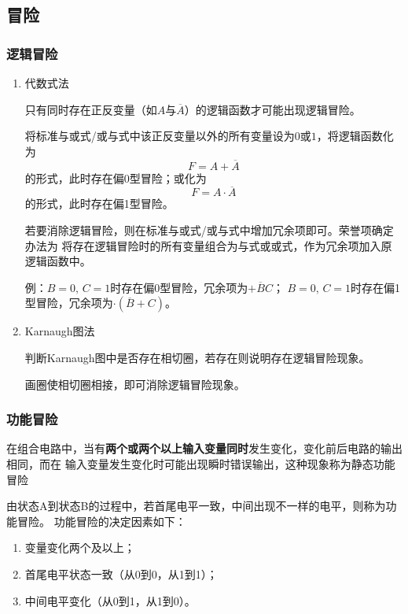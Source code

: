 \documentclass[UTF8,fontset=fandol,zihao=5]{ctexart}
\begin{document}
\subsection{冒险}

\subsubsection{逻辑冒险}

\begin{methodbox}[逻辑冒险的判断与消除方法]
  \begin{enumerate}[label=\arabic*.]
    \item 代数式法
    
    只有同时存在正反变量（如$A$与$\overline{A}$）的逻辑函数才可能出现逻辑冒险。

    将标准与或式/或与式中该正反变量以外的所有变量设为$0$或$1$，将逻辑函数化为
    \[
    F=A+\overline{A}
    \]
    的形式，此时存在偏0型冒险；或化为
    \[
    F=A\cdot\overline{A}
    \]
    的形式，此时存在偏1型冒险。

    若要消除逻辑冒险，则在标准与或式/或与式中增加冗余项即可。荣誉项确定办法为
    将存在逻辑冒险时的所有变量组合为与式或或式，作为冗余项加入原逻辑函数中。

    例：$B=0,\,C=1$时存在偏0型冒险，冗余项为$+\overline{B}C$；
    $B=0,\,C=1$时存在偏1型冒险，冗余项为$\cdot(\overline{B}+C)$。

    \item Karnaugh图法

    判断Karnaugh图中是否存在相切圈，若存在则说明存在逻辑冒险现象。

    画圈使相切圈相接，即可消除逻辑冒险现象。
  \end{enumerate}

\end{methodbox}

\subsubsection{功能冒险}

在组合电路中，当有\textbf{两个或两个以上输入变量同时}发生变化，变化前后电路的输出相同，而在
输入变量发生变化时可能出现瞬时错误输出，这种现象称为静态功能冒险

由状态A到状态B的过程中，若首尾电平一致，中间出现不一样的电平，则称为功能冒险。
功能冒险的决定因素如下：
\begin{enumerate}[label=(\arabic*)]
  \item 变量变化两个及以上；
  \item 首尾电平状态一致（从0到0，从1到1）；
  \item 中间电平变化（从0到1，从1到0）。
\end{enumerate}
\end{document}
